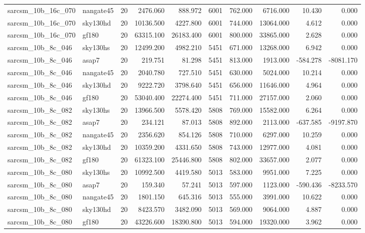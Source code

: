 \documentclass{article}
\begin{document}
\begin{longtable}{llrrrrrrrr}
sarcsm\_10b\_16c\_070 & nangate45 & 20 & 2476.060 & 888.972 & 6001 & 762.000 & 6716.000 & 10.430 & 0.000 \\
sarcsm\_10b\_16c\_070 & sky130hd & 20 & 10136.500 & 4227.800 & 6001 & 744.000 & 13064.000 & 4.612 & 0.000 \\
sarcsm\_10b\_16c\_070 & gf180 & 20 & 63315.100 & 26183.400 & 6001 & 800.000 & 33865.000 & 2.628 & 0.000 \\
sarcsm\_10b\_8c\_046 & sky130hs & 20 & 12499.200 & 4982.210 & 5451 & 671.000 & 13268.000 & 6.942 & 0.000 \\
sarcsm\_10b\_8c\_046 & asap7 & 20 & 219.751 & 81.298 & 5451 & 813.000 & 1913.000 & -584.278 & -8081.170 \\
sarcsm\_10b\_8c\_046 & nangate45 & 20 & 2040.780 & 727.510 & 5451 & 630.000 & 5024.000 & 10.214 & 0.000 \\
sarcsm\_10b\_8c\_046 & sky130hd & 20 & 9222.720 & 3798.640 & 5451 & 656.000 & 11646.000 & 4.964 & 0.000 \\
sarcsm\_10b\_8c\_046 & gf180 & 20 & 53040.400 & 22274.400 & 5451 & 711.000 & 27157.000 & 2.060 & 0.000 \\
sarcsm\_10b\_8c\_082 & sky130hs & 20 & 13966.500 & 5578.420 & 5808 & 769.000 & 15582.000 & 6.264 & 0.000 \\
sarcsm\_10b\_8c\_082 & asap7 & 20 & 234.121 & 87.013 & 5808 & 892.000 & 2113.000 & -637.585 & -9197.870 \\
sarcsm\_10b\_8c\_082 & nangate45 & 20 & 2356.620 & 854.126 & 5808 & 710.000 & 6297.000 & 10.259 & 0.000 \\
sarcsm\_10b\_8c\_082 & sky130hd & 20 & 10359.200 & 4331.650 & 5808 & 743.000 & 12977.000 & 4.081 & 0.000 \\
sarcsm\_10b\_8c\_082 & gf180 & 20 & 61323.100 & 25446.800 & 5808 & 802.000 & 33657.000 & 2.077 & 0.000 \\
sarcsm\_10b\_8c\_080 & sky130hs & 20 & 10992.500 & 4419.580 & 5013 & 583.000 & 9951.000 & 7.225 & 0.000 \\
sarcsm\_10b\_8c\_080 & asap7 & 20 & 159.340 & 57.241 & 5013 & 597.000 & 1123.000 & -590.436 & -8233.570 \\
sarcsm\_10b\_8c\_080 & nangate45 & 20 & 1801.150 & 645.316 & 5013 & 555.000 & 3991.000 & 10.622 & 0.000 \\
sarcsm\_10b\_8c\_080 & sky130hd & 20 & 8423.570 & 3482.090 & 5013 & 569.000 & 9064.000 & 4.887 & 0.000 \\
sarcsm\_10b\_8c\_080 & gf180 & 20 & 43226.600 & 18390.800 & 5013 & 594.000 & 19320.000 & 3.962 & 0.000 \\

\end{longtable}
\end{document}
